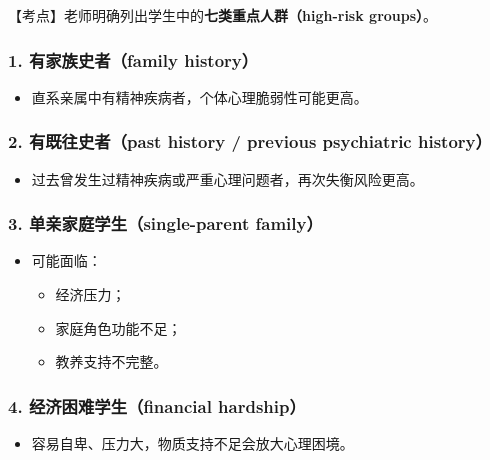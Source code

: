 \documentclass[
  chinese,
  9pt,
  a4paper,
]{ctexart}
\providecommand{\tightlist}{%
  \setlength{\itemsep}{0pt}\setlength{\parskip}{0pt}}
\begin{document}
【考点】老师明确列出学生中的\textbf{七类重点人群（high-risk groups）}。

\subsubsection{1. 有家族史者（family
history）}\label{ux6709ux5bb6ux65cfux53f2ux8005family-history}

\begin{itemize}
\tightlist
\item
  直系亲属中有精神疾病者，个体心理脆弱性可能更高。
\end{itemize}

\subsubsection{2. 有既往史者（past history / previous psychiatric
history）}\label{ux6709ux65e2ux5f80ux53f2ux8005past-history-previous-psychiatric-history}

\begin{itemize}
\tightlist
\item
  过去曾发生过精神疾病或严重心理问题者，再次失衡风险更高。
\end{itemize}

\subsubsection{3. 单亲家庭学生（single-parent
family）}\label{ux5355ux4eb2ux5bb6ux5eadux5b66ux751fsingle-parent-family}

\begin{itemize}
\item
  可能面临：

  \begin{itemize}
  \tightlist
  \item
    经济压力；
  \item
    家庭角色功能不足；
  \item
    教养支持不完整。
  \end{itemize}
\end{itemize}

\subsubsection{4. 经济困难学生（financial
hardship）}\label{ux7ecfux6d4eux56f0ux96beux5b66ux751ffinancial-hardship}

\begin{itemize}
\tightlist
\item
  容易自卑、压力大，物质支持不足会放大心理困境。
\end{itemize}
\end{document}

